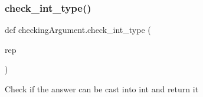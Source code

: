 \subsubsection{\texorpdfstring{check\+\_\+int\+\_\+type()}{check\_int\_type()}}
{\footnotesize\ttfamily def checking\+Argument.\+check\+\_\+int\+\_\+type (\begin{DoxyParamCaption}\item[{}]{rep }\end{DoxyParamCaption})}

\begin{DoxyVerb}Check if the answer can be cast into int
    and return it
\end{DoxyVerb}
 